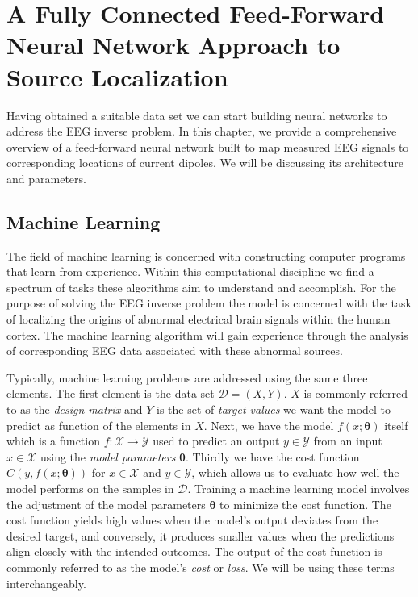 \documentclass[a4paper, UKenglish, 11pt]{uiomaster}
\begin{document}
\chapter{A Fully Connected Feed-Forward Neural Network Approach to Source Localization} \label{chap:fcnn-approach}

Having obtained a suitable data set we can start building neural networks to address the EEG inverse problem. In this chapter, we provide a comprehensive overview of a feed-forward neural network built to map measured EEG signals to corresponding locations of current dipoles. We will be discussing its architecture and parameters.

\section{Machine Learning}
The field of machine learning is concerned with constructing computer programs that learn from experience. Within this computational discipline we find a spectrum of tasks these algorithms aim to understand and accomplish. For the purpose of solving the EEG inverse problem the model is concerned with the task of localizing the origins of abnormal electrical brain signals within the human cortex. The machine learning algorithm will gain experience through the analysis of corresponding EEG data associated with these abnormal sources.

Typically, machine learning problems are addressed using the same three elements.
The first element is the data set $\mathcal{D} = (X, Y)$. $X$ is commonly referred to as the \emph{design matrix} and $Y$ is the set of \emph{target values} we want the model to predict as function of the elements in $X$.
Next, we have the model $f(x; \boldsymbol{\theta})$ itself which is a function $f : \mathcal{X} \to \mathcal{Y}$ used to predict an output $y \in \mathcal{Y}$ from an input $x \in \mathcal{X}$ using the \emph{model parameters} $\boldsymbol{\theta}$.
Thirdly we have the cost function $C(y, f(x; \boldsymbol{\theta}))$ for $x \in \mathcal{X}$ and $y \in \mathcal{Y}$, which allows us to evaluate how well the model performs on the samples in $\mathcal{D}$. Training a machine learning model involves the adjustment of the model parameters $\boldsymbol{\theta}$ to minimize the cost function. The cost function yields high values when the model's output deviates from the desired target, and conversely, it produces smaller values when the predictions align closely with the intended outcomes. The output of the cost function is commonly referred to as the model's \emph{cost} or \emph{loss}. We will be using these terms interchangeably.
\end{document}
